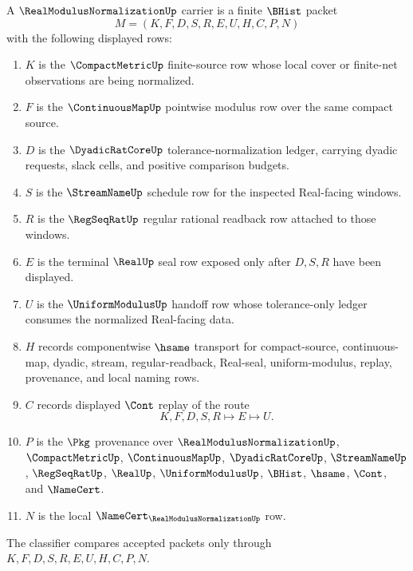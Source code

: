\begin{definition}
\label{def:real-modulus-normalization-carrier}
A $\RealModulusNormalizationUp$ carrier is a finite $\BHist$ packet
$$
M=(K,F,D,S,R,E,U,H,C,P,N)
$$
with the following displayed rows:
\begin{enumerate}
\item $K$ is the $\CompactMetricUp$ finite-source row whose local cover or finite-net observations are being normalized.
\item $F$ is the $\ContinuousMapUp$ pointwise modulus row over the same compact source.
\item $D$ is the $\DyadicRatCoreUp$ tolerance-normalization ledger, carrying dyadic requests, slack cells, and positive comparison budgets.
\item $S$ is the $\StreamNameUp$ schedule row for the inspected Real-facing windows.
\item $R$ is the $\RegSeqRatUp$ regular rational readback row attached to those windows.
\item $E$ is the terminal $\RealUp$ seal row exposed only after $D,S,R$ have been displayed.
\item $U$ is the $\UniformModulusUp$ handoff row whose tolerance-only ledger consumes the normalized Real-facing data.
\item $H$ records componentwise $\hsame$ transport for compact-source, continuous-map, dyadic, stream, regular-readback, Real-seal, uniform-modulus, replay, provenance, and local naming rows.
\item $C$ records displayed $\Cont$ replay of the route
$$
K,F,D,S,R \longmapsto E \longmapsto U .
$$
\item $P$ is the $\Pkg$ provenance over $\RealModulusNormalizationUp$, $\CompactMetricUp$, $\ContinuousMapUp$, $\DyadicRatCoreUp$, $\StreamNameUp$, $\RegSeqRatUp$, $\RealUp$, $\UniformModulusUp$, $\BHist$, $\hsame$, $\Cont$, and $\NameCert$.
\item $N$ is the local $\NameCert_{\RealModulusNormalizationUp}$ row.
\end{enumerate}
The classifier compares accepted packets only through $K,F,D,S,R,E,U,H,C,P,N$.
\end{definition}

